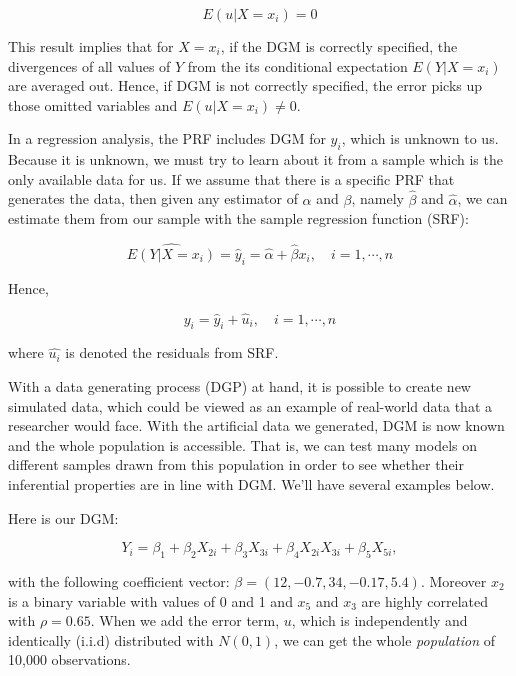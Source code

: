\documentclass[
]{book}
\begin{document}
\[
E\left(u | X=x_{i}\right)=0
\]

This result implies that for \(X=x_i\), if the DGM is correctly specified, the divergences of all values of \(Y\) from the its conditional expectation \(E(Y\vert X=x_i)\) are averaged out. Hence, if DGM is not correctly specified, the error picks up those omitted variables and \(E\left(u | X=x_{i}\right)\neq0\).

In a regression analysis, the PRF includes DGM for \(y_i\), which is unknown to us. Because it is unknown, we must try to learn about it from a sample which is the only available data for us. If we assume that there is a specific PRF that generates the data, then given any estimator of \(\alpha\) and \(\beta\), namely \(\hat{\beta}\) and \(\hat{\alpha}\), we can estimate them from our sample with the sample regression function (SRF):

\[
\widehat{E\left(Y | X=x_{i}\right)}=\hat{y}_{i}=\hat{\alpha}+\hat{\beta} x_{i}, \quad i=1, \cdots, n
\]

Hence,

\[
y_{i}=\hat{y}_{i}+\hat{u}_{i}, \quad i=1, \cdots, n
\]

where \(\hat{u_i}\) is denoted the residuals from SRF.

With a data generating process (DGP) at hand, it is possible to create new simulated data, which could be viewed as an example of real-world data that a researcher would face. With the artificial data we generated, DGM is now known and the whole population is accessible. That is, we can test many models on different samples drawn from this population in order to see whether their inferential properties are in line with DGM. We'll have several examples below.

Here is our DGM:

\[
Y_{i}=\beta_{1}+\beta_{2} X_{2 i}+\beta_{3} X_{3 i}+\beta_{4} X_{2 i} X_{3 i}+\beta_{5} X_{5 i},
\]

with the following coefficient vector: \(\beta = (12, -0.7, 34, -0.17, 5.4)\). Moreover \(x_2\) is a binary variable with values of 0 and 1 and \(x_5\) and \(x_3\) are highly correlated with \(\rho = 0.65\). When we add the error term, \(u\), which is independently and identically (i.i.d) distributed with \(N(0,1)\), we can get the whole \emph{population} of 10,000 observations.
\end{document}
